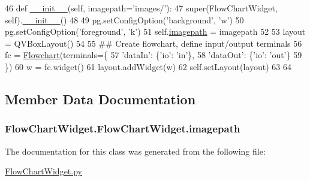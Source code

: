 \begin{DoxyCode}
46     \textcolor{keyword}{def }\hyperlink{classFlowChartWidget_1_1FlowChartWidget_ad19de55f5900fbc68c169860999f6326}{\_\_init\_\_}(self, imagepath='images/'):
47         super(FlowChartWidget, self).\hyperlink{classFlowChartWidget_1_1FlowChartWidget_ad19de55f5900fbc68c169860999f6326}{\_\_init\_\_}()
48         
49         pg.setConfigOption(\textcolor{stringliteral}{'background'}, \textcolor{stringliteral}{'w'})
50         pg.setConfigOption(\textcolor{stringliteral}{'foreground'}, \textcolor{stringliteral}{'k'})
51         self.\hyperlink{classFlowChartWidget_1_1FlowChartWidget_a66a1b98ec0242c5f6ed4148a806593dc}{imagepath} = imagepath
52 
53         layout = QVBoxLayout()
54         
55         \textcolor{comment}{## Create flowchart, define input/output terminals}
56         fc = \hyperlink{namespaceFlowchart}{Flowchart}(terminals=\{
57             \textcolor{stringliteral}{'dataIn'}: \{\textcolor{stringliteral}{'io'}: \textcolor{stringliteral}{'in'}\},
58             \textcolor{stringliteral}{'dataOut'}: \{\textcolor{stringliteral}{'io'}: \textcolor{stringliteral}{'out'}\}    
59             \})
60         w = fc.widget()
61         layout.addWidget(w)
62         self.setLayout(layout)
63         
64 
\end{DoxyCode}


\subsection{Member Data Documentation}
\hypertarget{classFlowChartWidget_1_1FlowChartWidget_a66a1b98ec0242c5f6ed4148a806593dc}{}
\subsubsection[{imagepath}]{\setlength{\rightskip}{0pt plus 5cm}Flow\+Chart\+Widget.\+Flow\+Chart\+Widget.\+imagepath}\label{classFlowChartWidget_1_1FlowChartWidget_a66a1b98ec0242c5f6ed4148a806593dc}


The documentation for this class was generated from the following file\+:\begin{DoxyCompactItemize}
\item 
\hyperlink{FlowChartWidget_8py}{Flow\+Chart\+Widget.\+py}\end{DoxyCompactItemize}
